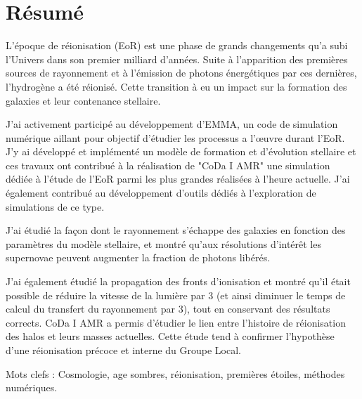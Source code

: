 \begingroup
\let\clearpage\relax
\let\cleardoublepage\relax
\let\cleardoublepage\relax

\chapter*{Résumé}
L’époque de réionisation (EoR) est une phase de grands changements qu’a subi l’Univers dans son premier milliard d’années. 
Suite à l’apparition des premières sources de rayonnement et à l’émission de photons énergétiques par ces dernières, l’hydrogène a été réionisé. 
Cette transition à eu un impact sur la formation des galaxies et leur contenance stellaire.

J’ai activement participé au développement d’EMMA, un code de simulation numérique aillant pour objectif d’étudier les processus a l’œuvre durant l’EoR. 
J’y ai développé et implémenté un modèle de formation et d’évolution stellaire et ces travaux ont contribué à la réalisation de "CoDa I AMR" une simulation dédiée à l’étude de l’EoR parmi les plus grandes réalisées à l’heure actuelle. 
J’ai également contribué au développement d’outils dédiés à l’exploration de simulations de ce type.

J’ai étudié la façon dont le rayonnement s’échappe des galaxies en fonction des paramètres du modèle stellaire, et montré qu'aux résolutions d’intérêt les supernovae peuvent augmenter la fraction de photons libérés.

J’ai également étudié la propagation des fronts d’ionisation et montré qu’il était possible de réduire la vitesse de la lumière par 3 (et ainsi diminuer le temps de calcul du transfert du rayonnement par 3), tout en conservant des résultats corrects.
CoDa I AMR a permis d'étudier le lien entre l'histoire de réionisation des halos et leurs masses actuelles.
Cette étude tend à confirmer l'hypothèse d'une réionisation précoce et interne du Groupe Local.


\vspace{0.5cm}

Mots clefs : Cosmologie, age sombres, réionisation, premières étoiles, méthodes numériques.
\vfill

\newpage

